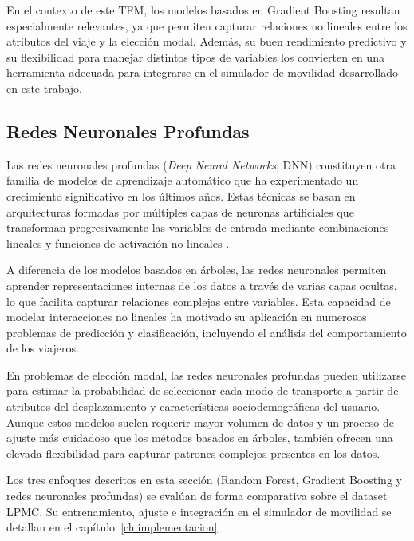 En el contexto de este TFM, los modelos basados en Gradient Boosting resultan especialmente relevantes, ya que permiten capturar relaciones no lineales entre los atributos del viaje y la elección modal. Además, su buen rendimiento predictivo y su flexibilidad para manejar distintos tipos de variables los convierten en una herramienta adecuada para integrarse en el simulador de movilidad desarrollado en este trabajo.

\subsection{Redes Neuronales Profundas}

Las redes neuronales profundas (\textit{Deep Neural Networks}, DNN) constituyen otra familia de modelos de aprendizaje automático que ha experimentado un crecimiento significativo en los últimos años. Estas técnicas se basan en arquitecturas formadas por múltiples capas de neuronas artificiales que transforman progresivamente las variables de entrada mediante combinaciones lineales y funciones de activación no lineales \cite{Goodfellow2016}.

A diferencia de los modelos basados en árboles, las redes neuronales permiten aprender representaciones internas de los datos a través de varias capas ocultas, lo que facilita capturar relaciones complejas entre variables. Esta capacidad de modelar interacciones no lineales ha motivado su aplicación en numerosos problemas de predicción y clasificación, incluyendo el análisis del comportamiento de los viajeros.

En problemas de elección modal, las redes neuronales profundas pueden utilizarse para estimar la probabilidad de seleccionar cada modo de transporte a partir de atributos del desplazamiento y características sociodemográficas del usuario. Aunque estos modelos suelen requerir mayor volumen de datos y un proceso de ajuste más cuidadoso que los métodos basados en árboles, también ofrecen una elevada flexibilidad para capturar patrones complejos presentes en los datos.

Los tres enfoques descritos en esta sección (Random Forest, Gradient Boosting y redes neuronales profundas) se evalúan de forma comparativa sobre el dataset LPMC. Su entrenamiento, ajuste e integración en el simulador de movilidad se detallan en el capítulo~\ref{ch:implementacion}.


